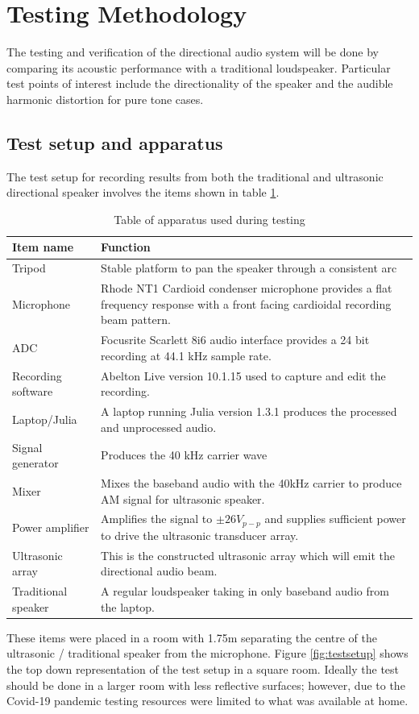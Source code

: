 \section{Testing Methodology}
The testing and verification of the directional audio system will be done by comparing its acoustic performance with a traditional loudspeaker. Particular test points of interest include the directionality of the speaker and the audible harmonic distortion for pure tone cases.
\subsection{Test setup and apparatus}
The test setup for recording results from both the traditional and ultrasonic directional speaker involves the items shown in table \ref{tab:apparatus}.
\begin{table}[H]
    \centering
    \begin{tabular}{|l|p{12cm}|}
    \hline
         \textbf{Item name}& \textbf{Function} \\ \hline
        Tripod & Stable platform to pan the speaker through a consistent arc \\ \hline
        Microphone & Rhode NT1 Cardioid condenser microphone provides a flat frequency response with a front facing cardioidal recording beam pattern. \\ \hline
        ADC & Focusrite Scarlett 8i6 audio interface provides a 24 bit recording at 44.1 kHz sample rate.\\ \hline
        Recording software & Abelton Live version 10.1.15 used to capture and edit the recording. \\ \hline
        Laptop/Julia & A laptop running Julia version 1.3.1 produces the processed and unprocessed audio. \\ \hline
        Signal generator & Produces the 40 kHz carrier wave \\ \hline
        Mixer & Mixes the baseband audio with the 40kHz carrier to produce AM signal for ultrasonic speaker. \\ \hline
        Power amplifier & Amplifies the signal to $\pm 26 V_{p-p}$ and supplies sufficient power to drive the ultrasonic transducer array.\\ \hline
        Ultrasonic array & This is the constructed ultrasonic array which will emit the directional audio beam. \\ \hline
        Traditional speaker & A regular loudspeaker taking in only baseband audio from the laptop. \\ \hline
    \end{tabular}
    \caption{Table of apparatus used during testing}
    \label{tab:apparatus}
\end{table}
These items were placed in a room with 1.75m separating the centre of the ultrasonic / traditional speaker from the microphone. Figure \ref{fig:testsetup} shows the top down representation of the test setup in a square room. Ideally the test should be done in a larger room with less reflective surfaces; however, due to the Covid-19 pandemic testing resources were limited to what was available at home.

